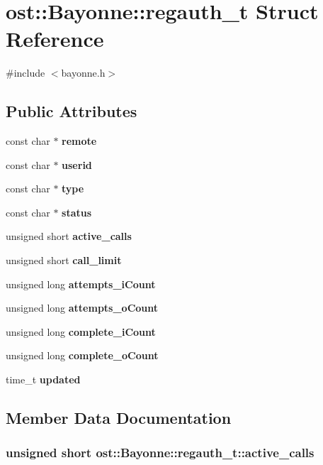 \section{ost::Bayonne::regauth\_\-t Struct Reference}
\label{structost_1_1_bayonne_1_1regauth__t}


{\ttfamily \#include $<$bayonne.h$>$}\subsection*{Public Attributes}
\begin{DoxyCompactItemize}
\item 
const char $\ast$ {\bf remote}
\item 
const char $\ast$ {\bf userid}
\item 
const char $\ast$ {\bf type}
\item 
const char $\ast$ {\bf status}
\item 
unsigned short {\bf active\_\-calls}
\item 
unsigned short {\bf call\_\-limit}
\item 
unsigned long {\bf attempts\_\-iCount}
\item 
unsigned long {\bf attempts\_\-oCount}
\item 
unsigned long {\bf complete\_\-iCount}
\item 
unsigned long {\bf complete\_\-oCount}
\item 
time\_\-t {\bf updated}
\end{DoxyCompactItemize}


\subsection{Member Data Documentation}
\subsubsection[{active\_\-calls}]{\setlength{\rightskip}{0pt plus 5cm}unsigned short {\bf ost::Bayonne::regauth\_\-t::active\_\-calls}}\label{structost_1_1_bayonne_1_1regauth__t_ac8d884fa5da2a93ce9308f4735ce487b}
